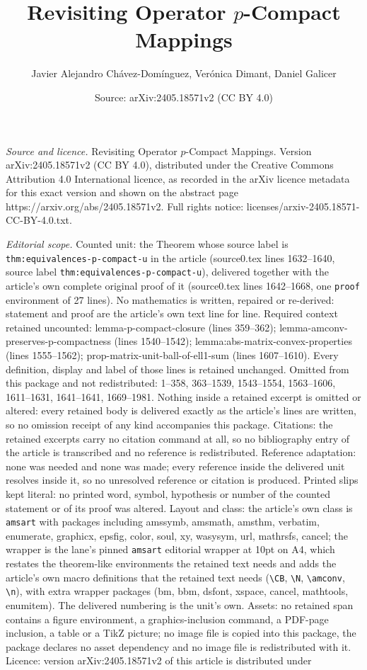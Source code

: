 \documentclass[10pt,a4paper]{amsart}
\title[Revisiting Operator $p$-Compact Mappings]{Revisiting Operator $p$-Compact Mappings}
\author{Javier Alejandro Ch\'avez-Dom\'inguez, Ver\'onica Dimant, Daniel Galicer}
\date{Source: arXiv:2405.18571v2 (CC BY 4.0)}
\begin{document}
\maketitle

\noindent\emph{Source and licence.} Revisiting Operator $p$-Compact Mappings. Version arXiv:2405.18571v2 (CC BY 4.0), distributed under the Creative Commons Attribution 4.0 International licence, as recorded in the arXiv licence metadata for this exact version and shown on the abstract page https://arxiv.org/abs/2405.18571v2. Full rights notice: licenses/arxiv-2405.18571-CC-BY-4.0.txt.\par\smallskip

\noindent\textit{Editorial scope.} Counted unit: the Theorem whose source label is \texttt{thm:equivalences-p-compact-u} in the article (source0.tex lines 1632--1640, source label \texttt{thm:equivalences-p-compact-u}), delivered together with the article's own complete original proof of it (source0.tex lines 1642--1668, one \texttt{proof} environment of 27 lines). No mathematics is written, repaired or re-derived: statement and proof are the article's own text line for line. Required context retained uncounted: lemma-p-compact-closure (lines 359--362); lemma-amconv-preserves-p-compactness (lines 1540--1542); lemma:abs-matrix-convex-properties (lines 1555--1562); prop-matrix-unit-ball-of-ell1-sum (lines 1607--1610). Every definition, display and label of those lines is retained unchanged. Omitted from this package and not redistributed: 1--358, 363--1539, 1543--1554, 1563--1606, 1611--1631, 1641--1641, 1669--1981. Nothing inside a retained excerpt is omitted or altered: every retained body is delivered exactly as the article's lines are written, so no omission receipt of any kind accompanies this package. Citations: the retained excerpts carry no citation command at all, so no bibliography entry of the article is transcribed and no reference is redistributed. Reference adaptation: none was needed and none was made; every reference inside the delivered unit resolves inside it, so no unresolved reference or citation is produced. Printed slips kept literal: no printed word, symbol, hypothesis or number of the counted statement or of its proof was altered. Layout and class: the article's own class is \texttt{amsart} with packages including amssymb, amsmath, amsthm, verbatim, enumerate, graphicx, epsfig, color, soul, xy, wasysym, url, mathrsfs, cancel; the wrapper is the lane's pinned \texttt{amsart} editorial wrapper at 10pt on A4, which restates the theorem-like environments the retained text needs and adds the article's own macro definitions that the retained text needs (\texttt{\textbackslash CB}, \texttt{\textbackslash N}, \texttt{\textbackslash amconv}, \texttt{\textbackslash n}), with extra wrapper packages (bm, bbm, dsfont, xspace, cancel, mathtools, enumitem). The delivered numbering is the unit's own. Assets: no retained span contains a figure environment, a graphics-inclusion command, a PDF-page inclusion, a table or a TikZ picture; no image file is copied into this package, the package declares no asset dependency and no image file is redistributed with it. Licence: version arXiv:2405.18571v2 of this article is distributed under 
\end{document}
